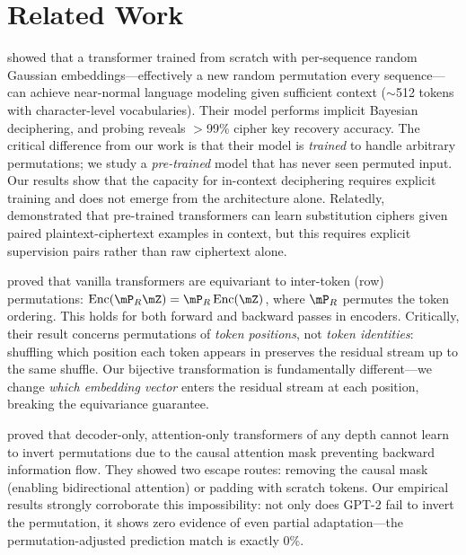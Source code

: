 \section{Related Work}
\label{sec:related_work}

\citet{huang2023lexinvariant} showed that a transformer trained from scratch with per-sequence random Gaussian embeddings---effectively a new random permutation every sequence---can achieve near-normal language modeling given sufficient context ($\sim$512 tokens with character-level vocabularies). Their model performs implicit Bayesian deciphering, and probing reveals $>$99\% cipher key recovery accuracy. The critical difference from our work is that their model is \emph{trained} to handle arbitrary permutations; we study a \emph{pre-trained} model that has never seen permuted input. Our results show that the capacity for in-context deciphering requires explicit training and does not emerge from the architecture alone. Relatedly, \citet{hao2025cipher} demonstrated that pre-trained transformers can learn substitution ciphers given paired plaintext-ciphertext examples in context, but this requires explicit supervision pairs rather than raw ciphertext alone.

\citet{xu2024permutation} proved that vanilla transformers are equivariant to inter-token (row) permutations: $\text{Enc}(\mP_R \mZ) = \mP_R \, \text{Enc}(\mZ)$, where $\mP_R$ permutes the token ordering. This holds for both forward and backward passes in encoders. Critically, their result concerns permutations of \emph{token positions}, not \emph{token identities}: shuffling which position each token appears in preserves the residual stream up to the same shuffle. Our bijective transformation is fundamentally different---we change \emph{which embedding vector} enters the residual stream at each position, breaking the equivariance guarantee.

\citet{alur2025impossibility} proved that decoder-only, attention-only transformers of any depth cannot learn to invert permutations due to the causal attention mask preventing backward information flow. They showed two escape routes: removing the causal mask (enabling bidirectional attention) or padding with scratch tokens. Our empirical results strongly corroborate this impossibility: not only does GPT-2 fail to invert the permutation, it shows zero evidence of even partial adaptation---the permutation-adjusted prediction match is exactly 0\%.

